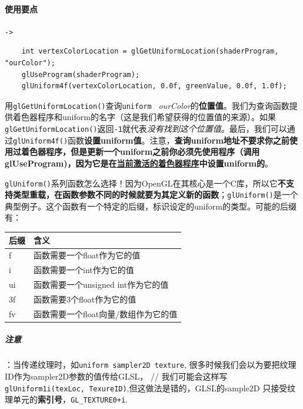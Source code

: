 \documentclass[UTF8,a4paper,12pt]{ctexbook}
\begin{document}
			\paragraph{使用要点}\verb|->|
				\begin{lstlisting}
	int vertexColorLocation = glGetUniformLocation(shaderProgram, "ourColor");
	glUseProgram(shaderProgram);
	glUniform4f(vertexColorLocation, 0.0f, greenValue, 0.0f, 1.0f);
				\end{lstlisting}
				
				用\verb|glGetUniformLocation()|查询\verb|uniform | \textit{ourColor}的\textbf{位置值}。我们为查询函数提供着色器程序和uniform的名字（这是我们希望获得的位置值的来源）。如果\verb|glGetUniformLocation()|返回\verb|-1|就代表\textit{没有找到这个位置值}。最后，我们可以通过\verb|glUniform4f()|函数\textbf{设置uniform值}。注意，\textbf{查询uniform地址不要求你之前使用过着色器程序，但是更新一个uniform之前你必须先使用程序（调用glUseProgram)，因为它是在\underline{当前激活的着色器程序}中设置uniform的}。
				
				\verb|glUniform()|系列函数怎么选择！因为OpenGL在其核心是一个C库，所以它\textbf{不支持类型重载，在函数参数不同的时候就要为其定义新的函数}；\verb|glUniform()|是一个典型例子。这个函数有一个特定的后缀，标识设定的uniform的类型。可能的后缀有：
				\begin{table}[H]
					\centering
					\begin{tabular}{p{3cm}|p{10cm}}
						\toprule
							后缀 &  含义 	\\
						\midrule
							f	&	函数需要一个float作为它的值\\
							i	&	函数需要一个int作为它的值	\\
							ui	&	函数需要一个unsigned int作为它的值\\
							3f	&	函数需要3个float作为它的值		\\
							fv	&	函数需要一个float向量/数组作为它的值\\					
						\bottomrule
					\end{tabular}
				\end{table}
				
				\subparagraph{注意}：当传递纹理时，如\verb|uniform sampler2D texture|, 很多时候我们会以为要把纹理ID作为sampler2D参数的值传给GLSL，  
				// 我们可能会这样写\verb|glUniform1i(texLoc, TexureID)|,但这做法是错的，GLSL的sample2D 只接受纹理单元的\textbf{索引号}，\verb|GL_TEXTURE0+i|.
					
\end{document}
